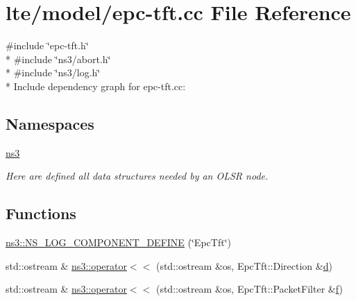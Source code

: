 \hypertarget{epc-tft_8cc}{}\section{lte/model/epc-\/tft.cc File Reference}
\label{epc-tft_8cc}
{\ttfamily \#include \char`\"{}epc-\/tft.\+h\char`\"{}}\\*
{\ttfamily \#include \char`\"{}ns3/abort.\+h\char`\"{}}\\*
{\ttfamily \#include \char`\"{}ns3/log.\+h\char`\"{}}\\*
Include dependency graph for epc-\/tft.cc\+:
\subsection*{Namespaces}
\begin{DoxyCompactItemize}
\item 
 \hyperlink{namespacens3}{ns3}
\begin{DoxyCompactList}\small\item\em Here are defined all data structures needed by an O\+L\+SR node. \end{DoxyCompactList}\end{DoxyCompactItemize}
\subsection*{Functions}
\begin{DoxyCompactItemize}
\item 
\hyperlink{namespacens3_aa1ca3126214e17660f0c43b9c9f6ff36}{ns3\+::\+N\+S\+\_\+\+L\+O\+G\+\_\+\+C\+O\+M\+P\+O\+N\+E\+N\+T\+\_\+\+D\+E\+F\+I\+NE} (\char`\"{}Epc\+Tft\char`\"{})
\item 
std\+::ostream \& \hyperlink{namespacens3_a21ba8e0e3652e137b3e9008fdb92090d}{ns3\+::operator$<$$<$} (std\+::ostream \&os, Epc\+Tft\+::\+Direction \&\hyperlink{lte__pathloss_8m_a1aabac6d068eef6a7bad3fdf50a05cc8}{d})
\item 
std\+::ostream \& \hyperlink{namespacens3_a3278e18d600dee04d7cec65952a86ba1}{ns3\+::operator$<$$<$} (std\+::ostream \&os, Epc\+Tft\+::\+Packet\+Filter \&\hyperlink{80211b_8c_ae7ffc1a8f84fa47a0812b2f2b9627132}{f})
\end{DoxyCompactItemize}
